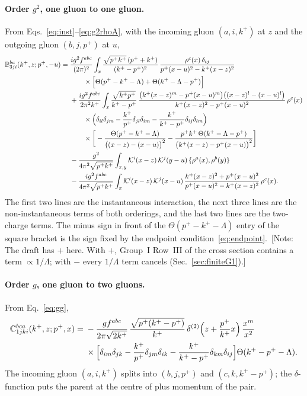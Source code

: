 \documentclass[aps,prd,onecolumn,superscriptaddress,nofootinbib,floatfix,longbibliography,11pt]{revtex4-2}
\numberwithin{equation}{section}
\newif\ifshownotes \shownotestrue
\newcommand{\note}[1]{\ifshownotes{\color{red}\,[\textsf{Note:} #1]}\fi}
\newcommand{\KK}{\mathcal{K}}
\def\mf#1{\mathbb{#1}}
\begin{document}
\paragraph*{Order $g^2$, one gluon to one gluon.} From Eqs.~\eqref{eq:inst}--\eqref{eq:g2rhoA}, with the incoming gluon $(a,i,k^+)$ at $z$ and the outgoing gluon $(b,j,p^+)$ at $u$,
\begin{align}
\mf B^{ba}_{3ji}(k^+,z;p^+,-u)={}&\frac{ig^2f^{abc}}{(2\pi)^2}\int_x\frac{\sqrt{p^+k^+}\,(p^++k^+)}{(k^+-p^+)^2}\,\frac{\rho^c(x)\,\delta_{ij}}{p^+(x-u)^2-k^+(x-z)^2}\notag\\
&\qquad\times\Big[\Theta(p^+-k^+-\Lambda)+\Theta(k^+-\Lambda-p^+)\Big]\notag\\
&+\frac{ig^2f^{abc}}{2\pi^2k^+}\int_x\frac{\sqrt{k^+p^+}}{k^+-p^+}\,\frac{\big(k^+(x-z)^m-p^+(x-u)^m\big)\big((x-z)^l-(x-u)^l\big)}{k^+(x-z)^2-p^+(x-u)^2}\,\rho^c(x)\notag\\
&\qquad\times\Big(\delta_{il}\delta_{jm}-\frac{k^+}{p^+}\delta_{jl}\delta_{im}-\frac{k^+}{k^+-p^+}\delta_{ij}\delta_{lm}\Big)\notag\\
&\qquad\times\bigg[-\frac{\Theta(p^+-k^+-\Lambda)}{\big((x-z)-(x-u)\big)^2}-\frac{p^+k^+\,\Theta(k^+-\Lambda-p^+)}{\big(k^+(x-z)-p^+(x-u)\big)^2}\bigg]\notag\\
&-\frac{g^2}{4\pi^2\sqrt{p^+k^+}}\int_{x,y}\KK^i(x-z)\,\KK^j(y-u)\,\{\rho^a(x),\rho^b(y)\}\notag\\
&-\frac{ig^2f^{abc}}{4\pi^2\sqrt{p^+k^+}}\int_x\KK^i(x-z)\,\KK^j(x-u)\,\frac{k^+(x-z)^2+p^+(x-u)^2}{p^+(x-u)^2-k^+(x-z)^2}\,\rho^c(x).
\label{eq:B3X}
\end{align}
The first two lines are the instantaneous interaction, the next three lines are the non-instantaneous terms of both orderings, and the last two lines are the two-charge terms. The minus sign in front of the $\Theta(p^+-k^+-\Lambda)$ entry of the square bracket is the sign fixed by the endpoint condition~\eqref{eq:endpoint}.
\note{The draft has $+$ here. With $+$, Group~I Row~III of the cross section contains a term $\propto1/\Lambda$; with $-$ every $1/\Lambda$ term cancels (Sec.~\ref{sec:finiteG1}).}

\paragraph*{Order $g$, one gluon to two gluons.} From Eq.~\eqref{eq:gg},
\begin{align}
\mf C^{bca}_{1jki}(k^+,z;p^+,x)={}&-\frac{gf^{abc}}{2\pi\sqrt{2k^+}}\,\frac{\sqrt{p^+(k^+-p^+)}}{k^+}\,\delta^{(2)}\Big(z+\frac{p^+}{k^+}x\Big)\,\frac{x^m}{x^2}\notag\\
&\times\Big[\delta_{im}\delta_{jk}-\frac{k^+}{p^+}\delta_{jm}\delta_{ik}-\frac{k^+}{k^+-p^+}\delta_{km}\delta_{ij}\Big]\Theta(k^+-p^+-\Lambda).
\label{eq:C1X}
\end{align}
The incoming gluon $(a,i,k^+)$ splits into $(b,j,p^+)$ and $(c,k,k^+-p^+)$; the $\delta$-function puts the parent at the centre of plus momentum of the pair.
\end{document}
